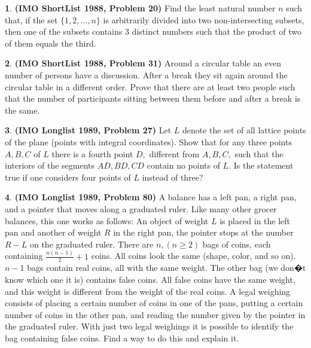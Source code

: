 \documentclass{article}
\newcommand{\plus}{+}
\newcommand{\minus}{-}
\theoremstyle{definition}
\newtheorem{p}{}
\begin{document}
\begin{p}{\bf (IMO ShortList 1988, Problem 20)}
Find the least natural number $ n$ such that, if the set $ \{1,2, \ldots, n\}$ is arbitrarily divided into two non-intersecting subsets, then one of the subsets contains 3 distinct numbers such that the product of two of them equals the third.
\end{p}



\begin{p}{\bf (IMO ShortList 1988, Problem 31)}
Around a circular table an even number of persons have a discussion. After a break they sit again around the circular table in a different order. Prove that there are at least two people such that the number of participants sitting between them before and after a break is the same.
\end{p}





\begin{p}{\bf (IMO Longlist 1989, Problem 27)}
Let $ L$ denote the set of all lattice points of the plane (points with integral coordinates). Show that for any three points $ A,B,C$ of $ L$ there is a fourth point $ D,$ different from $ A,B,C,$ such that the interiors of the segments $ AD,BD,CD$ contain no points of $ L.$ Is the statement true if one considers four points of $ L$ instead of three?
\end{p}



\begin{p}{\bf (IMO Longlist 1989, Problem 80)}
A balance has a left pan, a right pan, and a pointer that moves along a graduated ruler. Like many other grocer balances, this one works as follows: An object of weight $ L$ is placed in the left pan and another of weight $ R$ in the right pan, the pointer stops at the number $ R \minus{} L$ on the graduated ruler. There are $ n, (n \geq 2)$ bags of coins, each containing $ \frac{n(n\minus{}1)}{2} \plus{} 1$ coins. All coins look the same (shape, color, and so on).  $ n\minus{}1$ bags contain real coins, all with the same weight. The other bag (we don�t know which one it is) contains false coins.  All false coins have the same weight, and this weight is different from the weight of the real coins. A legal weighing consists of placing a certain number of coins in one of the pans, putting a certain number of coins in the other pan, and reading the number given by the pointer in the graduated ruler. With just two legal weighings it is possible to identify the bag containing false coins. Find a way to do this and explain it.
\end{p}
\end{document}
